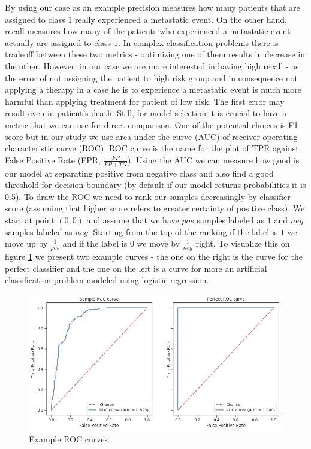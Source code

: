 \documentclass[12pt, wide]{mwart}
\begin{document}
By using our case as an example precision measures how many patients that are assigned to class $1$ really experienced a metastatic event. On the other hand, recall measures how many of the patients who experienced a metastatic event actually are assigned to class $1$. In complex classification problems there is tradeoff between these two metrics - optimizing one of them results in decrease in the other. However, in our case we are more interested in having high recall - as the error of not assigning the patient to high risk group and in consequence not applying a therapy in a case he is to experience a metastatic event is much more harmful than applying treatment for patient of low risk. The first error may result even in patient's death. Still, for model selection it is crucial to have a metric that we can use for direct comparison. One of the potential choices is F1-score but in our study we use area under the curve (AUC) of receiver operating characteristic curve (ROC). ROC curve is the name for the plot of TPR against False Positive Rate (FPR, $\frac{FP}{FP + TN}$). Using the AUC we can measure how good is our model at separating positive from negative class and also find a good threshold for decision boundary (by default if our model returns probabilities it is 0.5). To draw the ROC we need to rank our samples decreasingly by classifier score (assuming that higher score refers to greater certainty of positive class). We start at point $(0,0)$ and assume that we have $pos$ samples labeled as $1$ and $neg$ samples labeled as $neg$. Starting from the top of the ranking if the label is $1$ we move up by $\frac{1}{pos}$ and if the label is $0$ we move by $\frac{1}{neg}$ right. To visualize this on figure \ref{fig:roc} we present two example curves - the one on the right is the curve for the perfect classifier and the one on the left is a curve for more an artificial classification problem modeled using logistic regression.

\begin{figure}
\centering
\includegraphics[width=\textwidth]{images/rocExample.png}
\caption{Example ROC curves}
\label{fig:roc}
\end{figure}
\end{document}
